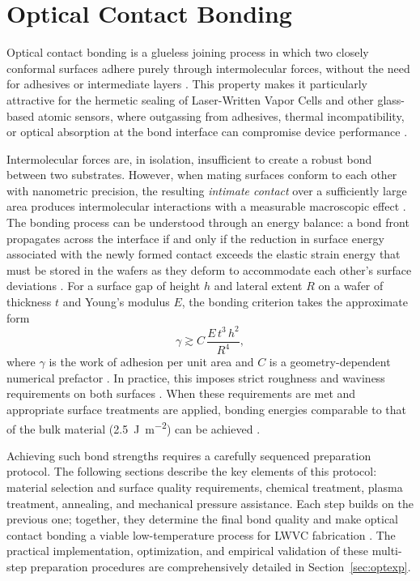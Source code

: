 \section{Optical Contact Bonding}
\label{sec:optical_contact_bonding}
\FloatBarrier
Optical contact bonding is a glueless joining process in which two closely 
conformal surfaces adhere purely through intermolecular forces, without the 
need for adhesives or intermediate layers \cite{rammhandbook}. 
This property makes it particularly attractive for the hermetic sealing of 
Laser-Written Vapor Cells and other glass-based atomic sensors, where 
outgassing from adhesives, thermal incompatibility, or optical absorption 
at the bond interface can compromise device performance \cite{art2025}.

Intermolecular forces are, in isolation, insufficient to create a robust bond 
between two substrates. However, when mating surfaces conform to each other 
with nanometric precision, the resulting \textit{intimate contact} over a 
sufficiently large area produces intermolecular interactions with a measurable 
macroscopic effect \cite{haisma1994}. The bonding process can be understood 
through an energy balance: a bond front propagates across the interface if and 
only if the reduction in surface energy associated with the newly formed 
contact exceeds the elastic strain energy that must be stored in the wafers 
as they deform to accommodate each other's surface deviations 
\cite{turner2006,gosele1998, possl1999}. For a surface gap of height $h$ and lateral 
extent $R$ on a wafer of thickness $t$ and Young's modulus $E$, the bonding 
criterion takes the approximate form
%
\begin{equation}
    \gamma \gtrsim C \, \frac{E \, t^{3} \, h^{2}}{R^{4}},
    \label{eq:bonding_criterion}
\end{equation}
%
where $\gamma$ is the work of adhesion per unit area and $C$ is a 
geometry-dependent numerical prefactor \cite{turner2006,gosele1998}. 
In practice, this imposes strict roughness and 
waviness requirements on both surfaces \cite{rammhandbook}. When these 
requirements are met and appropriate surface treatments are applied, bonding 
energies comparable to that of the bulk material 
(\SI{2.5}{\joule\per\meter\squared}) can be achieved \cite{kalk2014}.

Achieving such bond strengths requires a carefully sequenced preparation 
protocol. The following sections describe the key elements of this protocol: 
material selection and surface quality requirements, chemical treatment, 
plasma treatment, annealing, and mechanical pressure assistance. Each step 
builds on the previous one; together, they determine the final bond quality 
and make optical contact bonding a viable low-temperature process for LWVC 
fabrication \cite{li2013}. The practical implementation, optimization, and 
empirical validation of these multi-step preparation procedures are 
comprehensively detailed in Section~\ref{sec:optexp}.

